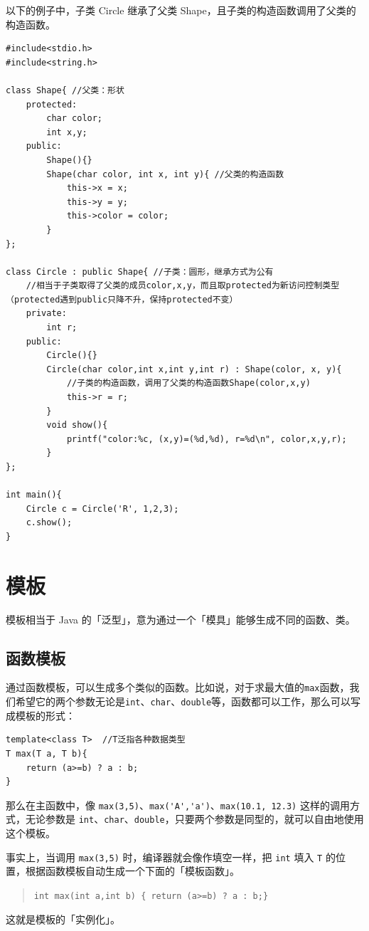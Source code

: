 \documentclass[UTF8]{ctexart}
\begin{document}
以下的例子中，子类 Circle 继承了父类 Shape，且子类的构造函数调用了父类的构造函数。
\begin{lstlisting}
#include<stdio.h>
#include<string.h>

class Shape{ //父类：形状
	protected:
		char color;
		int x,y;
	public:
		Shape(){}
		Shape(char color, int x, int y){ //父类的构造函数
			this->x = x;
			this->y = y;
			this->color = color;
		}
};

class Circle : public Shape{ //子类：圆形，继承方式为公有
    //相当于子类取得了父类的成员color,x,y，而且取protected为新访问控制类型（protected遇到public只降不升，保持protected不变）
	private:
		int r;
	public:
		Circle(){}
		Circle(char color,int x,int y,int r) : Shape(color, x, y){
			//子类的构造函数，调用了父类的构造函数Shape(color,x,y)
			this->r = r;
		}
		void show(){
			printf("color:%c, (x,y)=(%d,%d), r=%d\n", color,x,y,r);
		}
};

int main(){
	Circle c = Circle('R', 1,2,3);
	c.show();
}
\end{lstlisting}

\section{模板}
模板相当于 Java 的「泛型」，意为通过一个「模具」能够生成不同的函数、类。

\subsection{函数模板}
通过函数模板，可以生成多个类似的函数。比如说，对于求最大值的\verb!max!函数，我们希望它的两个参数无论是\verb!int!、\verb!char!、\verb!double!等，函数都可以工作，那么可以写成模板的形式：
\begin{lstlisting}
template<class T>  //T泛指各种数据类型
T max(T a, T b){
    return (a>=b) ? a : b;
}
\end{lstlisting}

那么在主函数中，像 \verb!max(3,5)!、\verb!max('A','a')!、\verb!max(10.1, 12.3)! 这样的调用方式，无论参数是 \verb!int!、\verb!char!、\verb!double!，只要两个参数是同型的，就可以自由地使用这个模板。

事实上，当调用 \verb!max(3,5)! 时，编译器就会像作填空一样，把 \verb!int! 填入 \verb!T! 的位置，根据函数模板自动生成一个下面的「模板函数」。
\begin{quote}
  \verb!int max(int a,int b) { return (a>=b) ? a : b;}!
\end{quote}
这就是模板的「实例化」。
\end{document}

